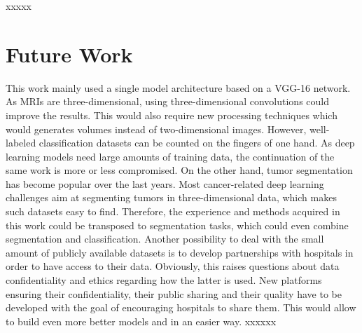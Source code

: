xxxxx


\section{Future Work}
\setlength{\marginparwidth}{3cm}\leavevmode {}This work mainly used a single model architecture based on a VGG-16 network. As MRIs are three-dimensional, using three-dimensional convolutions could improve the results. This would also require new processing techniques which would generates volumes instead of two-dimensional images. However, well-labeled classification datasets can be counted on the fingers of one hand. As deep learning models need large amounts of training data, the continuation of the same work is more or less compromised. On the other hand, tumor segmentation has become popular over the last years. Most cancer-related deep learning challenges aim at segmenting tumors in three-dimensional data, which makes such datasets easy to find. Therefore, the experience and methods acquired in this work could be transposed to segmentation tasks, which could even combine segmentation and classification. Another possibility to deal with the small amount of publicly available datasets is to develop partnerships with hospitals in order to have access to their data. Obviously, this raises questions about data confidentiality and ethics regarding how the latter is used. New platforms ensuring their confidentiality, their public sharing and their quality have to be developed with the goal of encouraging hospitals to share them. This would allow to build even more better models and in an easier way.
xxxxxx

